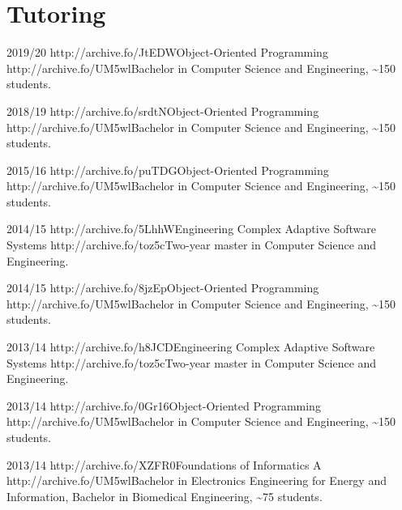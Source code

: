 \section{Tutoring}
\vspace{-1.9em}
\begin{outerlist}
    \item[2019/20]
        \shortunibocourse
        {http://archive.fo/JtEDW}{Object-Oriented Programming}
        {http://archive.fo/UM5wl}{Bachelor in Computer Science and Engineering}, \textasciitilde{}150 students.
    \item[2018/19]
        \shortunibocourse
        {http://archive.fo/srdtN}{Object-Oriented Programming}
        {http://archive.fo/UM5wl}{Bachelor in Computer Science and Engineering}, \textasciitilde{}150 students.
    \item[2015/16]
        \shortunibocourse
        {http://archive.fo/puTDG}{Object-Oriented Programming}
        {http://archive.fo/UM5wl}{Bachelor in Computer Science and Engineering}, \textasciitilde{}150 students.
    \item[2014/15]
        \shortunibocourse
        {http://archive.fo/5LhhW}{Engineering Complex Adaptive Software Systems}
        {http://archive.fo/toz5c}{Two-year master in Computer Science and Engineering}.
    \item[2014/15]
        \shortunibocourse
        {http://archive.fo/8jzEp}{Object-Oriented Programming}
        {http://archive.fo/UM5wl}{Bachelor in Computer Science and Engineering}, \textasciitilde{}150 students.
    \item[2013/14]
        \shortunibocourse
        {http://archive.fo/h8JCD}{Engineering Complex Adaptive Software Systems}
        {http://archive.fo/toz5c}{Two-year master in Computer Science and Engineering}.
    \item[2013/14]
        \shortunibocourse
        {http://archive.fo/0Gr16}{Object-Oriented Programming}
        {http://archive.fo/UM5wl}{Bachelor in Computer Science and Engineering}, \textasciitilde{}150 students.
    \item[2013/14]
        \shortunibocourse
        {http://archive.fo/XZFR0}{Foundations of Informatics A}
        {http://archive.fo/UM5wl}{Bachelor in Electronics Engineering for Energy and Information, Bachelor in Biomedical Engineering}, \textasciitilde{}75 students.
\end{outerlist}

